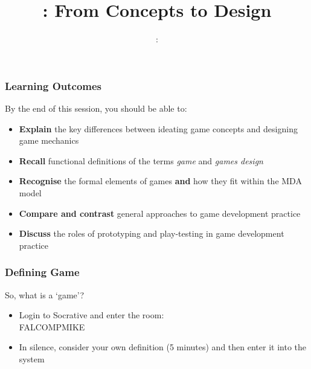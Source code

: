 \usepackage{../../beamerthemeFalmouthGamesAcademy}
\usepackage{multimedia}
\graphicspath{ {../../} }


\usepackage[normalem]{ulem}
\usepackage{wasysym}

\usepackage{pdfpages}

\usetikzlibrary{arrows,automata}







\title{\sessionnumber: From Concepts to Design}
\subtitle{\modulecode: \moduletitle}

\frame{\titlepage} 

\begin{frame}
	\frametitle{Learning Outcomes}
	
	By the end of this session, you should be able to:
	
	\begin{itemize}
		\item \textbf{Explain} the key differences between ideating game concepts and designing game mechanics
		\item \textbf{Recall} functional definitions of the terms \textit{game} and \textit{games design}
		\item \textbf{Recognise} the formal elements of games \textbf{and} how they fit within the MDA model
		\item \textbf{Compare and contrast} general approaches to game development practice
		\item \textbf{Discuss} the roles of prototyping and play-testing in game development practice
	\end{itemize}
\end{frame}

\begin{frame}
	\frametitle{Defining Game}
	
	So, what is a `game'?
	
	\begin{itemize}
		\item Login to Socrative and enter the room: \\ FALCOMPMIKE
		\item In silence, consider your own definition (5 minutes) and then enter it into the system
	\end{itemize}

\end{frame}

